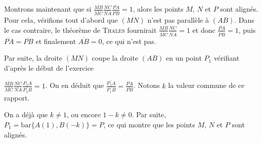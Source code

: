 {{\begin{itemize}
\end{itemize}

Montrons maintenant que si $\frac{\overline{MB}}{\overline{MC}}\frac{\overline{NC}}{\overline{NA}}\frac{\overline{PA}}{\overline{PB}}=1$, alors les points $M$, $N$ et $P$ sont alignés. Pour cela, vérifions tout d'abord que $(MN)$ n'est pas parallèle à $(AB)$. Dans le cas contraire, le théorème de \textsc{Thales} fournirait $\frac{\overline{MB}}{\overline{MC}}\frac{\overline{NC}}{\overline{NA}}=1$ et donc  $\frac{\overline{PA}}{\overline{PB}}=1$, puis $\overline{PA}=\overline{PB}$ et finalement $\overline{AB}=0$, ce qui n'est pas.

Par suite, la droite $(MN)$ coupe la droite $(AB)$ en un point $P_1$ vérifiant d'après le début de l'exercice

$\frac{\overline{MB}}{\overline{MC}}\frac{\overline{NC}}{\overline{NA}}\frac{\overline{P_1A}}{\overline{P_1B}}=1$. On en déduit que $\frac{\overline{P_1A}}{\overline{P_1B}}=\frac{\overline{PA}}{\overline{PB}}$. Notons $k$ la valeur commune de ce rapport.

On a déjà que $k\neq1$, ou encore $1-k\neq0$. Par suite, $P_1=\mbox{bar}\{A(1),B(-k)\}=P$, ce qui montre que les points $M$, $N$ et $P$ sont alignés.
}
}
